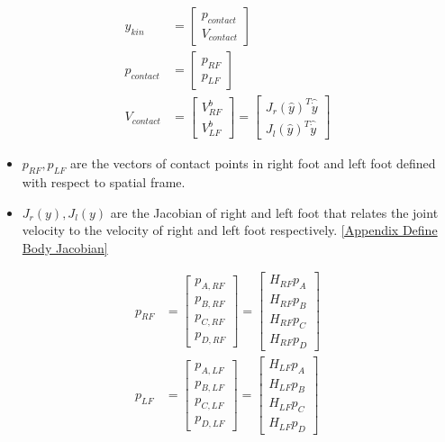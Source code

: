 \begin{enumerate}
\begin{equation}
    \label{eq:y_kin}
    \begin{split}
    y_{kin} &=
    \begin{bmatrix}
    p_{contact} \\ V_{contact}
    \end{bmatrix}\\
    p_{contact} &= \begin{bmatrix}p_{RF}\\ p_{LF}\end{bmatrix}\\
     V_{contact} &= \begin{bmatrix} V_{RF}^b \\ V_{LF}^b \end{bmatrix} = \begin{bmatrix} J_r(\hat{y})^T \hat{\dot{y}} \\ J_l(\hat{y})^T\hat{\dot{y}} \end{bmatrix}
    \end{split}
\end{equation}
\begin{itemize}
\item $p_{RF},p_{LF}$ are the vectors of contact points in right foot and left foot defined with respect to spatial frame.
\item $J_r(y), J_l(y)$ are the Jacobian of right and left foot that relates the joint velocity to the velocity of right and left foot respectively. \underline{[Appendix Define Body Jacobian]}
\end{itemize}
\begin{equation}
    \begin{split}
    p_{RF} &= \begin{bmatrix} p_{A,RF}\\ p_{B,RF}\\ p_{C,RF}\\ p_{D,RF}\end{bmatrix}= \begin{bmatrix} {H}_{RF}p_{A}\\  {H}_{RF}p_{B}\\  {H}_{RF}p_{C}\\  {H}_{RF}p_{D}\end{bmatrix} \\
    p_{LF} &= \begin{bmatrix} p_{A,LF}\\ p_{B,LF}\\ p_{C,LF}\\ p_{D,LF}\end{bmatrix}= \begin{bmatrix} {H}_{LF}p_{A}\\  {H}_{LF}p_{B}\\  {H}_{LF}p_{C}\\  {H}_{LF}p_{D}\end{bmatrix} \\

\end{split}
\end{equation}
\end{enumerate}
